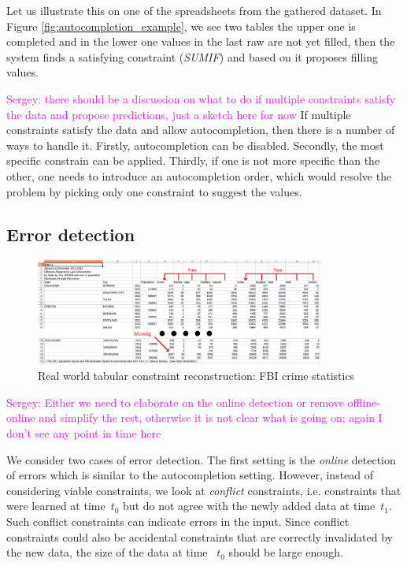 \documentclass{IEEEtran}
\newcommand{\sergey}[1]{\textcolor{magenta}{{\sc Sergey:} #1}\xspace}
\theoremstyle{definition}
\begin{document}
Let us illustrate this on one of the spreadsheets from the gathered dataset. In Figure \ref{fig:autocompletion_example}, we see two tables the upper one is completed and in the lower one values in the last raw are not yet filled, then the system finds a satisfying constraint (\textit{SUMIF}) and based on it proposes filling values.

\sergey{there should be a discussion on what to do if multiple constraints satisfy the data and propose predictions, just a sketch here for now}
If multiple constraints satisfy the data and allow autocompletion, then there is a number of ways to handle it. Firstly, autocompletion can be disabled. Secondly, the most specific constrain can be applied. Thirdly, if one is not more specific than the other, one needs to introduce an autocompletion order, which would resolve the problem by picking only one constraint to suggest the values.

\subsection{Error detection}
\begin{figure}[thb]
  \begin{center}
    \includegraphics[width=0.85\textwidth]{figures/fbi_figure_highlighted.png}
  \end{center}
  \caption{Real world tabular constraint reconstruction: FBI crime statistics}
  \label{fig:fbi}
\end{figure}


\sergey{Either we need to elaborate on the online detection or remove offline-online and simplify the rest, otherwise it is not clear what is going on; again I don't see any point in time here}

We consider two cases of error detection.
The first setting is the \textit{online} detection of errors which is similar to the autocompletion setting.
However, instead of considering viable constraints, we look at \textit{conflict} constraints, i.e. constraints that were learned at time~$t_0$ but do not agree with the newly added data at time~$t_1$.
Such conflict constraints can indicate errors in the input.
Since conflict constraints could also be accidental constraints that are correctly invalidated by the new data, the size of the data at time ~$t_0$ should be large enough.
\end{document}
